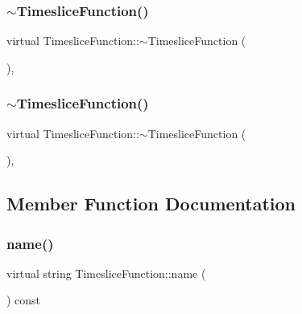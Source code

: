 \subsubsection{\texorpdfstring{$\sim$TimesliceFunction()}{~TimesliceFunction()}\hspace{0.1cm}{\footnotesize\ttfamily [1/2]}}
{\footnotesize\ttfamily virtual Timeslice\+Function\+::$\sim$\+Timeslice\+Function (\begin{DoxyParamCaption}{ }\end{DoxyParamCaption})\hspace{0.3cm}{\ttfamily [inline]}, {\ttfamily [virtual]}}

\mbox{\label{classTimesliceFunction_a5a3af2bca0b018658f57914bef2fe371}} 
\subsubsection{\texorpdfstring{$\sim$TimesliceFunction()}{~TimesliceFunction()}\hspace{0.1cm}{\footnotesize\ttfamily [2/2]}}
{\footnotesize\ttfamily virtual Timeslice\+Function\+::$\sim$\+Timeslice\+Function (\begin{DoxyParamCaption}{ }\end{DoxyParamCaption})\hspace{0.3cm}{\ttfamily [inline]}, {\ttfamily [virtual]}}



\subsection{Member Function Documentation}
\mbox{\label{classTimesliceFunction_addfcdb96287c354039a1536879cfe787}} 
\subsubsection{\texorpdfstring{name()}{name()}\hspace{0.1cm}{\footnotesize\ttfamily [1/2]}}
{\footnotesize\ttfamily virtual string Timeslice\+Function\+::name (\begin{DoxyParamCaption}{ }\end{DoxyParamCaption}) const\hspace{0.3cm}{\ttfamily [pure virtual]}}



